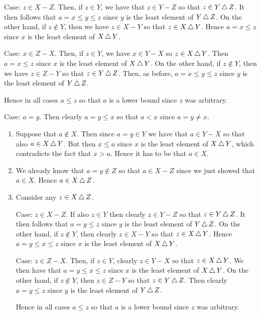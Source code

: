 {{\begin{enumerate}
      Case: $z \in X - Z$.
      Then, if $z \in Y$, we have that $z \in Y - Z$ so that $z \in Y \,\triangle\, Z$.
      It then follows that $a = x \leq y \leq z$ since $y$ is the least element of $Y \,\triangle\, Z$.
      On the other hand, if $z \notin Y$, then we have $z \in X - Y$ so that $z \in X \,\triangle\, Y$.
      Hence $a = x \leq z$ since $x$ is the least element of $X \,\triangle\, Y$.

      Case: $x \in Z - X$.
      Then, if $z \in Y$, we have $x \in Y - X$ so $z \in X \,\triangle\, Y$.
      Then $a = x \leq z$ since $x$ is the least element of $X \,\triangle\, Y$.
      On the other hand, if $z \notin Y$, then we have $z \in Z - Y$ so that $z \in Y \,\triangle\, Z$.
      Then, as before, $a = x \leq y \leq z$ since $y$ is the least element of $Y \,\triangle\, Z$.

      Hence in all cases $a \leq z$ so that $a$ is a lower bound since $z$ was arbitrary.
    \end{enumerate}

    Case: $a = y$.
    Then clearly $a = y \leq x$ so that $a < x$ since $a = y \neq x$.
    \begin{enumerate}
    \item Suppose that $a \notin X$.
      Then since $a = y \in Y$ we have that $a \in Y - X$ so that also $a \in X \,\triangle\, Y$.
      But then $x \leq a$ since $x$ is the least element of $X \,\triangle\, Y$, which contradicts the fact that $x > a$.
      Hence it has to be that $a \in X$.
    \item We already know that $a = y \notin Z$ so that $a \in X - Z$ since we just showed that $a \in X$.
      Hence $a \in X \,\triangle\, Z$.
    \item Consider any $z \in X \,\triangle\, Z$.

      Case: $z \in X - Z$.
      If also $z \in Y$ then clearly $z \in Y - Z$ so that $z \in Y \,\triangle\, Z$.
      It then follows that $a = y \leq z$ since $y$ is the least element of $Y \,\triangle\, Z$.
      On the other hand, if $z \notin Y$, then clearly $z \in X - Y$ so that $z \in X \,\triangle\, Y$.
      Hence $a = y \leq x \leq z$ since $x$ is the least element of $X \,\triangle\, Y$.

      Case: $z \in Z - X$.
      Then, if $z \in Y$, clearly $z \in Y - X$ so that $z \in X \,\triangle\, Y$.
      We then have that $a = y \leq x \leq z$ since $x$ is the least element of $X \,\triangle\, Y$.
      On the other hand, if $z \notin Y$, then $z \in Z - Y$ so that $z \in Y \,\triangle\, Z$.
      Then clearly $a = y \leq z$ since $y$ is the least element of $Y \,\triangle\, Z$.

      Hence in all cases $a \leq z$ so that $a$ is a lower bound since $z$ was arbitrary.
    \end{enumerate}
    
}}
